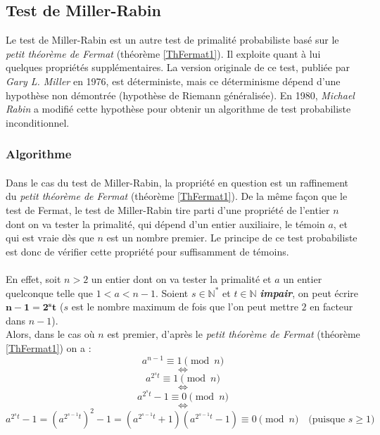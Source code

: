 \subsection{Test de Miller-Rabin}
	Le test de Miller-Rabin est un autre test de primalité probabiliste basé sur le \textit{petit théorème de Fermat} (théorème \ref{ThFermat1}). Il exploite quant à lui quelques propriétés supplémentaires. La version originale de ce test, publiée par \textit{Gary L. Miller} en 1976, est déterministe, mais ce déterminisme dépend d'une hypothèse non démontrée (hypothèse de Riemann généralisée). En 1980, \textit{Michael Rabin} a modifié cette hypothèse pour obtenir un algorithme de test probabiliste inconditionnel.
	
	\subsubsection{Algorithme}
		
		\paragraph{} Dans le cas du test de Miller-Rabin, la propriété en question est un raffinement du \textit{petit théorème de Fermat} (théorème \ref{ThFermat1}). De la même façon que le test de Fermat, le test de Miller-Rabin tire parti d'une propriété de l'entier $n$ dont on va tester la primalité, qui dépend d'un entier auxiliaire, le témoin $a$, et qui est vraie dès que $n$ est un nombre premier. Le principe de ce test probabiliste est donc de vérifier cette propriété pour suffisamment de témoins.
		
		\paragraph{}En effet, soit $n > 2$ un entier dont on va tester la primalité et $a$ un entier quelconque telle que $1 < a < n - 1$. Soient $s \in \mathbb{N}^{*}$ et $t \in \mathbb{N}$ \textbf{\textit{impair}}, on peut écrire $\mathbf{n - 1 = 2^{s}t}$ ($s$ est le nombre maximum de fois que l'on peut mettre $2$ en facteur dans $n - 1$).\\
		Alors, dans le cas où $n$ est premier, d'après le \textit{petit théorème de Fermat} (théorème \ref{ThFermat1}) on a :
		\[a^{n-1}\equiv 1 \pmod n\]
		\[\Leftrightarrow\]
		\[a^{2^{s}t}\equiv 1 \pmod n\]
		\[\Leftrightarrow\]
		\[a^{2^{s}t} - 1 \equiv 0 \pmod n\]
		\[\Leftrightarrow\]
		\[a^{2^{s}t} - 1 = (a^{2^{s-1}t})^{2} - 1 = (a^{2^{s-1}t} + 1)(a^{2^{s-1}t} - 1) \equiv 0 \pmod n	\quad	\text{(puisque } s \geqslant 1 \text{)}\]
		
